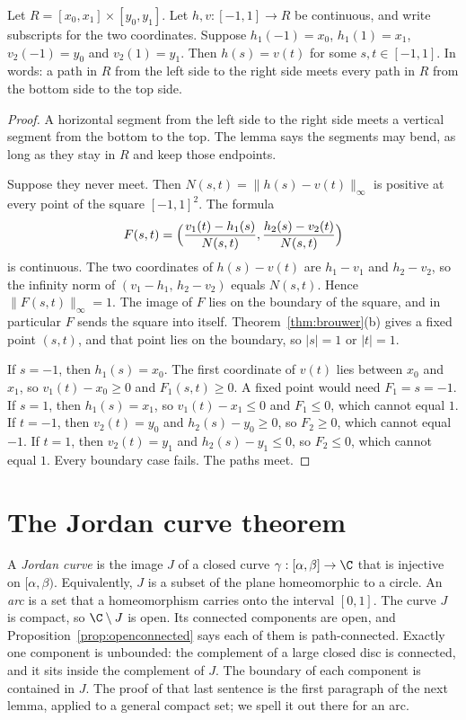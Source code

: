 \begin{lemma}\label{lem:crossing}
Let $R=[x_0,x_1]\times[y_0,y_1]$. Let $h,v:[-1,1]\to R$ be continuous, and write subscripts for the two coordinates. Suppose $h_1(-1)=x_0$, $h_1(1)=x_1$, $v_2(-1)=y_0$ and $v_2(1)=y_1$. Then $h(s)=v(t)$ for some $s,t\in[-1,1]$. In words: a path in $R$ from the left side to the right side meets every path in $R$ from the bottom side to the top side.
\end{lemma}
\begin{proof}
A horizontal segment from the left side to the right side meets a vertical segment from the bottom to the top. The lemma says the segments may bend, as long as they stay in $R$ and keep those endpoints.

Suppose they never meet. Then $N(s,t)=\|h(s)-v(t)\|_\infty$ is positive at every point of the square $[-1,1]^2$. The formula
\[
F(s,t)=\Bigl(\frac{v_1(t)-h_1(s)}{N(s,t)},\frac{h_2(s)-v_2(t)}{N(s,t)}\Bigr)
\]
is continuous. The two coordinates of $h(s)-v(t)$ are $h_1-v_1$ and $h_2-v_2$, so the infinity norm of $(v_1-h_1,\,h_2-v_2)$ equals $N(s,t)$. Hence $\|F(s,t)\|_\infty=1$. The image of $F$ lies on the boundary of the square, and in particular $F$ sends the square into itself. Theorem~\ref{thm:brouwer}(b) gives a fixed point $(s,t)$, and that point lies on the boundary, so $|s|=1$ or $|t|=1$.

If $s=-1$, then $h_1(s)=x_0$. The first coordinate of $v(t)$ lies between $x_0$ and $x_1$, so $v_1(t)-x_0\ge0$ and $F_1(s,t)\ge0$. A fixed point would need $F_1=s=-1$. If $s=1$, then $h_1(s)=x_1$, so $v_1(t)-x_1\le0$ and $F_1\le0$, which cannot equal $1$. If $t=-1$, then $v_2(t)=y_0$ and $h_2(s)-y_0\ge0$, so $F_2\ge0$, which cannot equal $-1$. If $t=1$, then $v_2(t)=y_1$ and $h_2(s)-y_1\le0$, so $F_2\le0$, which cannot equal $1$. Every boundary case fails. The paths meet.
\end{proof}

\section{The Jordan curve theorem}

A \emph{Jordan curve} is the image $J$ of a closed curve $\gamma:[\alpha,\beta]\to\C$ that is injective on $[\alpha,\beta)$. Equivalently, $J$ is a subset of the plane homeomorphic to a circle. An \emph{arc} is a set that a homeomorphism carries onto the interval $[0,1]$. The curve $J$ is compact, so $\C\setminus J$ is open. Its connected components are open, and Proposition~\ref{prop:openconnected} says each of them is path-connected. Exactly one component is unbounded: the complement of a large closed disc is connected, and it sits inside the complement of $J$. The boundary of each component is contained in $J$. The proof of that last sentence is the first paragraph of the next lemma, applied to a general compact set; we spell it out there for an arc.


